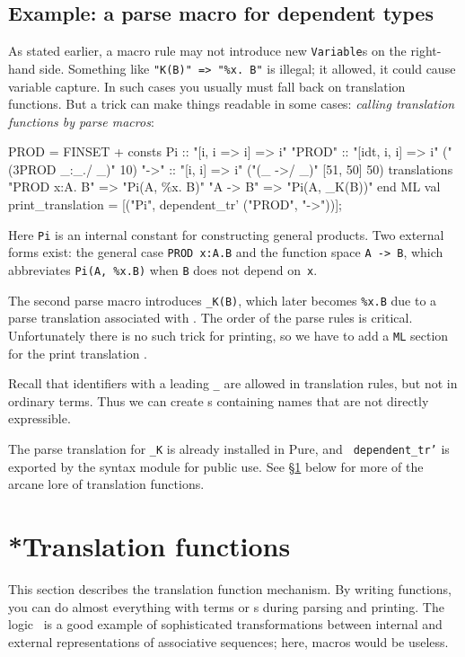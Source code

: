 \subsection{Example: a parse macro for dependent types}\label{prod_trans}
As stated earlier, a macro rule may not introduce new {\tt Variable}s on
the right-hand side.  Something like \verb|"K(B)" => "%x. B"| is illegal;
it allowed, it could cause variable capture.  In such cases you usually
must fall back on translation functions.  But a trick can make things
readable in some cases: {\em calling translation functions by parse
  macros}:
\begin{ttbox}
PROD = FINSET +
consts
  Pi            :: "[i, i => i] => i"
  "{\at}PROD"       :: "[idt, i, i] => i"     ("(3PROD _:_./ _)" 10)
  "{\at}->"         :: "[i, i] => i"          ("(_ ->/ _)" [51, 50] 50)
\ttbreak
translations
  "PROD x:A. B" => "Pi(A, \%x. B)"
  "A -> B"      => "Pi(A, _K(B))"
end
ML
  val print_translation = [("Pi", dependent_tr' ("{\at}PROD", "{\at}->"))];
\end{ttbox}

Here {\tt Pi} is an internal constant for constructing general products.
Two external forms exist: the general case {\tt PROD x:A.B} and the
function space {\tt A -> B}, which abbreviates \verb|Pi(A, %x.B)| when {\tt B}
does not depend on~{\tt x}.

The second parse macro introduces {\tt _K(B)}, which later becomes \verb|%x.B|
due to a parse translation associated with .  The order of the
parse rules is critical.  Unfortunately there is no such trick for
printing, so we have to add a {\tt ML} section for the print translation
.

Recall that identifiers with a leading {\tt _} are allowed in translation
rules, but not in ordinary terms.  Thus we can create \AST{}s containing
names that are not directly expressible.

The parse translation for {\tt _K} is already installed in Pure, and {\tt
dependent_tr'} is exported by the syntax module for public use.  See
\S\ref{sec:tr_funs} below for more of the arcane lore of translation functions.



\section{*Translation functions} \label{sec:tr_funs}
%
This section describes the translation function mechanism.  By writing
\ML{} functions, you can do almost everything with terms or \AST{}s during
parsing and printing.  The logic \LK\ is a good example of sophisticated
transformations between internal and external representations of
associative sequences; here, macros would be useless.

